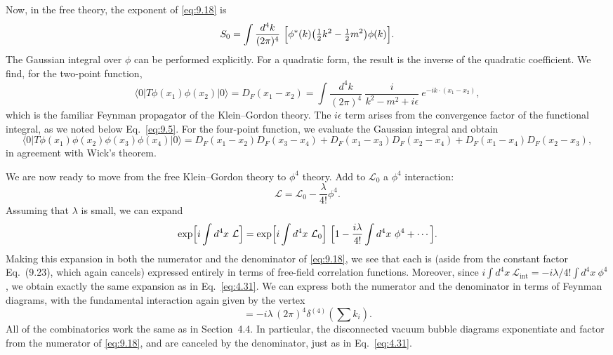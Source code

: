Now, in the free theory, the exponent of \eqref{eq:9.18} is
\begin{equation}
  S_0 = \int \frac{d^4k}{(2\pi)^4}\ \Bigl[ \phi^{*}(k)
    \bigl( \tfrac{1}{2}k^2 - \tfrac{1}{2}m^2 \bigr)\phi(k) \Bigr] .
\end{equation}
The Gaussian integral over $\phi$ can be performed explicitly.  For a
quadratic form, the result is the inverse of the quadratic coefficient.  We
find, for the two-point function,
\begin{equation}
  \langle 0|T\phi(x_1)\phi(x_2)|0\rangle = D_F(x_1-x_2)
  = \int \frac{d^4k}{(2\pi)^4}\ \frac{i}{k^2-m^2+i\epsilon}\
    e^{-ik\cdot(x_1-x_2)} ,
  \label{eq:9.28}
\end{equation}
which is the familiar Feynman propagator of the Klein--Gordon theory.  The
$i\epsilon$ term arises from the convergence factor of the functional integral,
as we noted below Eq.~\eqref{eq:9.5}.  For the four-point function, we
evaluate the Gaussian integral and obtain
\begin{equation}
  \langle 0|T\phi(x_1)\phi(x_2)\phi(x_3)\phi(x_4)|0\rangle
  = D_F(x_1-x_2)D_F(x_3-x_4)
    + D_F(x_1-x_3)D_F(x_2-x_4)
    + D_F(x_1-x_4)D_F(x_2-x_3) ,
  \label{eq:9.29}
\end{equation}
in agreement with Wick's theorem.

We are now ready to move from the free Klein--Gordon theory to $\phi^4$
theory.  Add to $\mathcal{L}_0$ a $\phi^4$ interaction:
\begin{equation}
  \mathcal{L} = \mathcal{L}_0 - \frac{\lambda}{4!}\phi^4 .
\end{equation}
Assuming that $\lambda$ is small, we can expand
\begin{equation}
  \exp\Bigl[ i\int d^4x\ \mathcal{L} \Bigr] = \exp\Bigl[
    i\int d^4x\ \mathcal{L}_0 \Bigr]\ \Bigl[ 1 - \frac{i\lambda}{4!}
      \int d^4x\ \phi^4 + \cdots \Bigr] .
\end{equation}
Making this expansion in both the numerator and the denominator of
\eqref{eq:9.18}, we see that each is (aside from the constant factor
Eq.~(9.23), which again cancels) expressed entirely in terms of free-field
correlation functions.  Moreover, since
$i\int d^4x\ \mathcal{L}_{\mathrm{int}} = -i\lambda/4!\int d^4x\ \phi^4$, we
obtain exactly the same expansion as in Eq.~\eqref{eq:4.31}.  We can express
both the numerator and the denominator in terms of Feynman diagrams, with the
fundamental interaction again given by the vertex
\begin{equation}
  = -i\lambda\,(2\pi)^4\delta^{(4)}(\textstyle\sum k_i) .
  \label{eq:9.30}
\end{equation}
All of the combinatorics work the same as in Section~4.4.  In particular, the
disconnected vacuum bubble diagrams exponentiate and factor from the
numerator of \eqref{eq:9.18}, and are canceled by the denominator, just as in
Eq.~\eqref{eq:4.31}.

